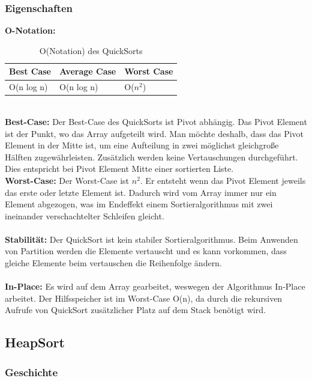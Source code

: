 \documentclass{article}
\begin{document}
\subsubsection{Eigenschaften}
\textbf{O-Notation:}
\begin{table}[h]
\centering
\begin{tabular}{lll}
	\hline
	\textbf{Best Case} & \textbf{Average Case} & \textbf{Worst Case} \\
	\hline
	O(n log n) & O(n log n) & O($n^{2}$) \\
	\hline
\end{tabular}
\caption{O(Notation) des QuickSorts \cite{India2015Dataset}}
\label{tab:QuickSort}
\end{table}
\\
\textbf{Best-Case:} Der Best-Case des QuickSorts ist Pivot abhängig. Das Pivot Element ist der Punkt, wo das Array aufgeteilt wird. Man möchte deshalb, dass das Pivot Element in der Mitte ist, um eine Aufteilung in zwei möglichst gleichgroße Hälften zugewährleisten. Zusätzlich werden keine Vertauschungen durchgeführt. Dies entspricht bei Pivot Element Mitte einer sortierten Liste.\\
\textbf{Worst-Case:} Der Worst-Case ist  $n^{2}$. Er entsteht wenn das Pivot Element jeweils das erste oder letzte Element ist. Dadurch wird vom Array immer nur ein Element abgezogen, was im Endeffekt einem Sortieralgorithmus mit zwei ineinander verschachtelter Schleifen gleicht.\\ \\
\textbf{Stabilität:} Der QuickSort ist kein stabiler Sortieralgorithmus. Beim Anwenden von Partition werden die Elemente vertauscht und es kann vorkommen, dass gleiche Elemente beim vertauschen die Reihenfolge ändern. \\
\\
\textbf{In-Place:} Es wird auf dem Array gearbeitet, weswegen der Algorithmus In-Place arbeitet. Der Hilfsspeicher ist im Worst-Case O(n), da durch die rekursiven Aufrufe von QuickSort zusätzlicher Platz auf dem Stack benötigt wird.\cite{sedgewick1978pivot}  \\
\subsection{HeapSort}
\subsubsection*{Geschichte}
\end{document}
